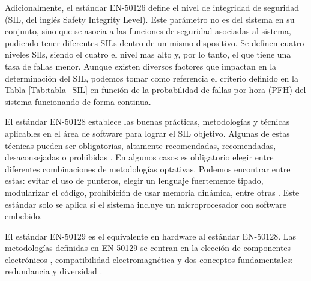     Adicionalmente, el estándar EN-50126 define el nivel de integridad de seguridad (SIL, del inglés Safety Integrity Level). Este parámetro no es del sistema en su conjunto, sino que se asocia a las funciones de seguridad asociadas al sistema, pudiendo tener diferentes SILs dentro de un mismo dispositivo. Se definen cuatro niveles SIls, siendo el cuatro el nivel mas alto y, por lo tanto, el que tiene una tasa de fallas menor. Aunque existen diversos factores que impactan en la determinación del SIL, podemos tomar como referencia el criterio definido en la Tabla \ref{Tab:tabla_SIL} en función de la probabilidad de fallas por hora (PFH) del sistema funcionando de forma continua.

    \begin{table}[H]
        {
        \caption{SIL en función de la Probabilidad de Fallas/Hora (PFH).}
        \label{Tab:tabla_SIL}
        \centering
            \begin{center}
            \end{center}
        }    
    \end{table}

    El estándar EN-50128 establece las buenas prácticas, metodologías y técnicas aplicables en el área de software para lograr el SIL objetivo. Algunas de estas técnicas pueden ser obligatorias, altamente recomendadas, recomendadas, desaconsejadas o prohibidas \cite{Paper_75,Paper_15,Paper_21,Paper_40,Paper_48,Paper_50,Paper_54,Paper_65}. En algunos casos es obligatorio elegir entre diferentes combinaciones de metodologías optativas. Podemos encontrar entre estas: evitar el uso de punteros, elegir un lenguaje fuertemente tipado, modularizar el código, prohibición de usar memoria dinámica, entre otras \cite{Paper_27,Paper_33,Paper_39,Paper_75}. Este estándar solo se aplica si el sistema incluye un microprocesador con software embebido.

    El estándar EN-50129 es el equivalente en hardware al estándar EN-50128. Las metodologías definidas en EN-50129 se centran en la elección de componentes electrónicos \cite{Paper_68,Paper_116,Paper_117,Paper_120,Paper_122,Paper_126}, compatibilidad electromagnética y dos conceptos fundamentales: redundancia \cite{Paper_23,Paper_29,Paper_32,Paper_42,Paper_49,Paper_97,Paper_98} y diversidad \cite{Paper_53,Paper_125,Paper_131,Paper_132,Paper_140,Paper_171}.

    